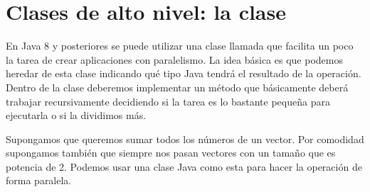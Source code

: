 \documentclass[letterpaper,10pt,spanish]{sphinxmanual}
\begin{document}
\section{Clases de alto nivel: la clase }
\label{\detokenize{textos/tema2:clases-de-alto-nivel-la-clase-recursivetask}}
En Java 8 y posteriores se puede utilizar una clase llamada  que facilita un poco la tarea de crear aplicaciones con paralelismo. La idea básica es que podemos heredar de esta clase indicando qué tipo Java tendrá el resultado de la operación. Dentro de la clase deberemos implementar un método  que básicamente deberá trabajar recursivamente decidiendo si la tarea es lo bastante pequeña para ejecutarla o si la dividimos más.

Supongamos que queremos sumar todos los números de un vector. Por comodidad supongamos también que siempre nos pasan vectores con un tamaño que es potencia de 2. Podemos usar una clase Java como esta para hacer la operación de forma paralela.
\end{document}

